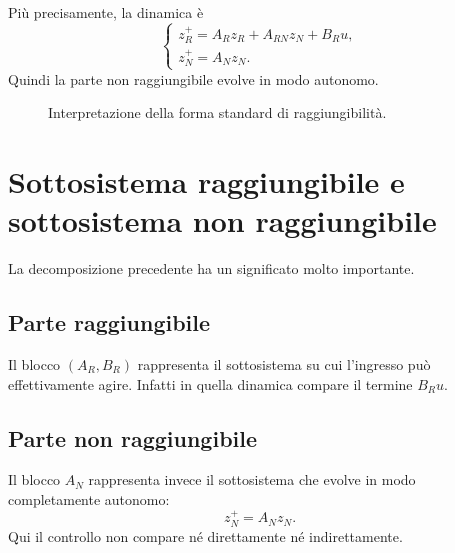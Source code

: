 Più precisamente, la dinamica è
\[
\begin{cases}
z_R^{+}=A_R z_R + A_{RN} z_N + B_R u,\\
z_N^{+}=A_N z_N.
\end{cases}
\]
Quindi la parte non raggiungibile evolve in modo autonomo.

\begin{figure}[H]
\centering
{}
\caption{Interpretazione della forma standard di raggiungibilità.}
\end{figure}

\section{Sottosistema raggiungibile e sottosistema non raggiungibile}

La decomposizione precedente ha un significato molto importante.

\subsection*{Parte raggiungibile}

Il blocco \((A_R,B_R)\) rappresenta il sottosistema su cui l’ingresso può effettivamente agire.  
Infatti in quella dinamica compare il termine \(B_Ru\).

\subsection*{Parte non raggiungibile}

Il blocco \(A_N\) rappresenta invece il sottosistema che evolve in modo completamente autonomo:
\[
z_N^{+}=A_N z_N.
\]
Qui il controllo non compare né direttamente né indirettamente.

